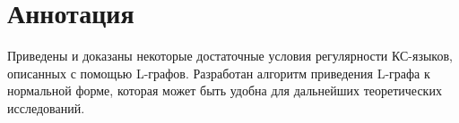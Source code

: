 \chapter*{Аннотация}

Приведены и доказаны некоторые достаточные условия регулярности КС-языков, описанных с помощью L-графов.
Разработан алгоритм приведения L-графа к нормальной форме, которая может быть удобна для дальнейших
теоретических исследований.

\pagebreak